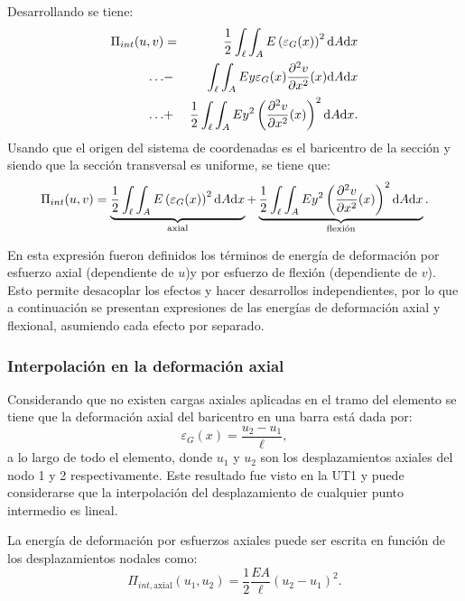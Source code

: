 %
Desarrollando se tiene:
%
\begin{eqnarray}
	\Pi_{int}(u,v) 
	&=& \frac{1}{2} \int_{\ell} \int_{A} E \left( \varepsilon_G(x)  \right)^2 {\text{d}} A {\text{d}} x \nonumber\\
	\dots &-&             \int_{\ell} \int_{A} E y \varepsilon_G(x)  \frac{\partial ^2 v}{\partial x^2}(x)  {\text{d}} A {\text{d}} x \nonumber\\
	\dots &+&             \frac{1}{2} \int_{\ell} \int_{A} E y^2 \left(  \frac{\partial ^2 v}{\partial x^2}(x) \right)^2 {\text{d}} A {\text{d}} x .
\end{eqnarray}
%
Usando que el origen del sistema de coordenadas es el baricentro de la sección y siendo que la sección transversal es uniforme, se tiene que:
%
\begin{equation}\label{eqn:pivigatotal}
	\Pi_{int}(u,v)  =
	\underbrace{ \frac{1}{2} \int_{\ell} \int_{A} E \left( \varepsilon_G(x)  \right)^2 {\text{d}} A {\text{d}} x }_{\text{axial}}
	+  
	\underbrace{ \frac{1}{2} \int_{\ell} \int_{A} E y^2 \left(  \frac{\partial ^2 v}{\partial x^2}(x) \right)^2 {\text{d}} A {\text{d}} x}_{\text{flexión}}.
\end{equation}
%

En esta expresión fueron definidos los términos de energía de deformación por esfuerzo axial (dependiente de $u$)y por esfuerzo de flexión (dependiente de $v$). %
%
Esto permite desacoplar los efectos y hacer desarrollos independientes, por lo que a continuación se presentan expresiones de las energías de deformación axial y flexional, asumiendo cada efecto por separado.

\subsubsection{Interpolación en la deformación axial}

Considerando que no existen cargas axiales aplicadas en el tramo del elemento se tiene que la deformación axial del baricentro en una barra está dada por:
%
\begin{equation}
	\varepsilon_G(x) = \frac{u_2 - u_1}{\ell},
\end{equation}
%
a lo largo de todo el elemento, 
donde $u_1$ y $u_2$ son los desplazamientos axiales del nodo 1 y 2 respectivamente. %
Este resultado fue visto en la UT1 y puede considerarse que la interpolación del desplazamiento de cualquier punto intermedio es lineal. %

La energía de deformación por esfuerzos axiales puede ser escrita en función de los desplazamientos nodales como:
%
\begin{equation}\label{eqn:Uaxial}
	\boxed{
	\Pi_{int,\text{axial}}(u_1,u_2) = \frac{1}{2} \frac{E A}{\ell} (u_2 - u_1)^2 .
	}
\end{equation}
%



